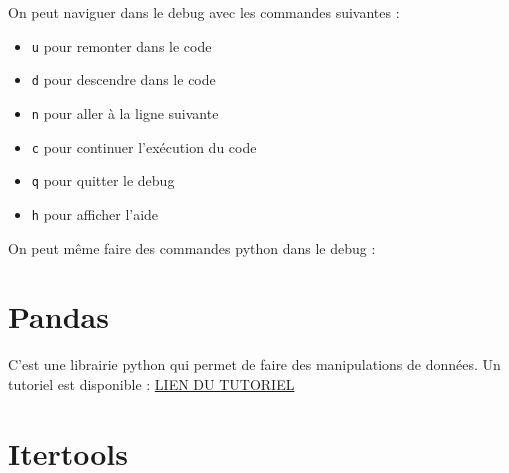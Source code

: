 \documentclass[11pt]{article}
\providecommand{\tightlist}{%
      \setlength{\itemsep}{0pt}\setlength{\parskip}{0pt}}
\newenvironment{Shaded}{}{}
\newcommand{\StringTok}[1]{\textcolor[rgb]{0.25,0.44,0.63}{{#1}}}
\newcommand{\FunctionTok}[1]{\textcolor[rgb]{0.02,0.16,0.49}{{#1}}}
\newcommand{\NormalTok}[1]{{#1}}
\newcommand{\OperatorTok}[1]{\textcolor[rgb]{0.40,0.40,0.40}{{#1}}}
\newcommand{\ExtensionTok}[1]{{#1}}
\begin{document}
On peut naviguer dans le debug avec les commandes suivantes :

\begin{itemize}
\tightlist
\item
  \texttt{u} pour remonter dans le code
\item
  \texttt{d} pour descendre dans le code
\item
  \texttt{n} pour aller à la ligne suivante
\item
  \texttt{c} pour continuer l'exécution du code
\item
  \texttt{q} pour quitter le debug
\item
  \texttt{h} pour afficher l'aide
\end{itemize}

On peut même faire des commandes python dans le debug :

\begin{Shaded}
\end{Shaded}

    \hypertarget{pandas}{%
\section{Pandas}\label{pandas}}

C'est une librairie python qui permet de faire des manipulations de
données. Un tutoriel est disponible :
\href{https://pandas.pydata.org/docs/user_guide/10min.html}{LIEN DU
TUTORIEL}

\hypertarget{itertools}{%
\section{Itertools}\label{itertools}}
\end{document}
